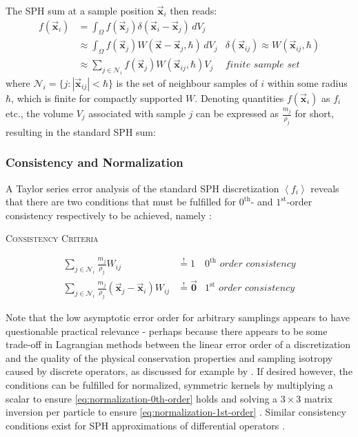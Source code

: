 \documentclass[oneside, a4paper]{book}
\newcommand\emphasis[1]{{\scshape\bfseries#1}}
\newcommand{\equationnamed}[2]{%
  \setlength{\fboxsep}{2pt} %
  \setlength{\fboxrule}{0.01pt}
  \begin{center}
    \begin{minipage}{\textwidth}
      \begin{center}\textsc{#1}\end{center}
      #2
    \end{minipage}
  \end{center}
}
\newcommand{\equationnamedbox}[2]{%
  \setlength{\fboxsep}{5pt} %
  \setlength{\fboxrule}{0.01pt}
  \begin{center}
    \fbox{
      \begin{minipage}{0.4\textwidth}
        \begin{center}\emphasis{#1}\end{center}
        #2
      \end{minipage}
    }
  \end{center}
}
\newcommand\abs[1]{\left|#1\right|}
\newcommand\angled[1]{\left\langle#1\right\rangle}
\newcommand\vek[1]{\vec{\bm{#1}}}
\newcommand\br[1]{\left(#1\right)}
\begin{document}
    The SPH sum at a sample position $\vek{x}_i$ then reads:
    \begin{align}
      f(\vek{x}_i) &= \int_\Omega f(\vek{x}_j)\delta(\vek{x}_i-\vek{x}_j)\,dV_j &\\ 
      &\approx \int_\Omega f(\vek{x}_j) W(\vek{x}-\vek{x}_j, \hbar)\,dV_j &\text{$\delta\br{\vek{x}_{ij}}\approx W\br{\vek{x}_{ij}, \hbar}$}\\
      &\approx \sum_{j\in\mathcal{N}_i} f(\vek{x}_j) W(\vek{x}_{ij}, \hbar) V_j  &\textit{finite sample set}
    \end{align}
    where $\mathcal{N}_i = \{j : \abs{\vek{x}_{ij}}<\hbar\}$ is the set of neighbour samples of $i$ within some radius $\hbar$, which is finite for compactly supported $W$. Denoting quantities $f(\vek{x}_i)$ as $f_i$ etc., the volume $V_j$ associated with sample $j$ can be expressed as $\frac{m_j}{\rho_j}$ for short, resulting in the standard SPH sum:
    \equationnamedbox{Standard SPH Sum}{\begin{equation}\label{eq:sph-sum}
      \angled{f_i} = \sum_{j\in\mathcal{N}_i} \frac{m_j}{\rho_j} f_j W_{ij} 
    \end{equation}}

    \subsubsection{Consistency and Normalization}
    A Taylor series error analysis of the standard SPH discretization $\angled{f_i}$ reveals that there are two conditions that must be fulfilled for $0^{\text{th}}$- and $1^{\text{st}}$-order consistency respectively to be achieved, namely \autocite{price-2012}:
    \equationnamed{Consistency Criteria}{
      \vspace{-0.3cm}
      \begin{align}
        \sum_{j\in\mathcal{N}_i} \frac{m_j}{\rho_j}W_{ij} &\overset{!}{=} 1 
        &\textit{$0^{\text{th}}$ order consistency}
        \label{eq:normalization-0th-order}\\
        \sum_{j\in\mathcal{N}_i} \frac{m_j}{\rho_j}\br{\vek{x}_j - \vek{x}_i}W_{ij} &\overset{!}{=} \vek{0}
        &\textit{$1^{\text{st}}$ order consistency}
        \label{eq:normalization-1st-order}
      \end{align}
    }
    Note that the low asymptotic error order for arbitrary samplings appears to have questionable practical relevance \autocite{tutorial2019} - perhaps because there appears to be some trade-off in Lagrangian methods between the linear error order of a discretization and the quality of the physical conservation properties and sampling isotropy caused by discrete operators, as discussed for example by \autocite[Price]{price-2012}. If desired however, the conditions can be fulfilled for normalized, symmetric kernels by multiplying a scalar to ensure \autoref{eq:normalization-0th-order} holds and solving a $3\times 3$ matrix inversion per particle to ensure \autoref{eq:normalization-1st-order} \autocites{tutorial2019}{price-2012}. Similar consistency conditions exist for SPH approximations of differential operators \autocite{price-2012}.
\end{document}
